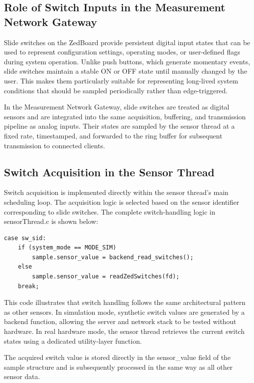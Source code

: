 \subsection{Role of Switch Inputs in the Measurement Network Gateway}
Slide switches on the ZedBoard provide persistent digital input states that can be used to represent configuration settings, operating modes, or user-defined flags during system operation. Unlike push buttons, which generate momentary events, slide switches maintain a stable ON or OFF state until manually changed by the user. This makes them particularly suitable for representing long-lived system conditions that should be sampled periodically rather than edge-triggered.

In the Measurement Network Gateway, slide switches are treated as digital sensors and are integrated into the same acquisition, buffering, and transmission pipeline as analog inputs. Their states are sampled by the sensor thread at a fixed rate, timestamped, and forwarded to the ring buffer for subsequent transmission to connected clients.

\subsection{Switch Acquisition in the Sensor Thread}
Switch acquisition is implemented directly within the sensor thread’s main scheduling loop. The acquisition logic is selected based on the sensor identifier corresponding to slide switches. The complete switch-handling logic in sensorThread.c is shown below:

\begin{verbatim}
case sw_sid:
    if (system_mode == MODE_SIM)
        sample.sensor_value = backend_read_switches();
    else
        sample.sensor_value = readZedSwitches(fd);
    break;
\end{verbatim}

This code illustrates that switch handling follows the same architectural pattern as other sensors. In simulation mode, synthetic switch values are generated by a backend function, allowing the server and network stack to be tested without hardware. In real hardware mode, the sensor thread retrieves the current switch states using a dedicated utility-layer function.

The acquired switch value is stored directly in the sensor\_value field of the sample structure and is subsequently processed in the same way as all other sensor data.

